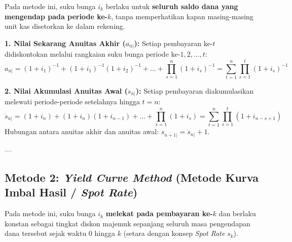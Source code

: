 \documentclass[11pt,a4paper]{article}
\begin{document}
\begin{definitionbox}
Pada metode ini, suku bunga $i_k$ berlaku untuk \textbf{seluruh saldo dana yang mengendap pada periode ke-$k$}, tanpa memperhatikan kapan masing-masing unit kas disetorkan ke dalam rekening.
\end{definitionbox}

\begin{center}
\end{center}

\textbf{1. Nilai Sekarang Anuitas Akhir ($a_{\overline{n}|}$):}
Setiap pembayaran ke-$t$ didiskontokan melalui rangkaian suku bunga periode ke-$1, 2, \dots, t$:
\begin{equation}
    a_{\overline{n}|} = (1+i_1)^{-1} + (1+i_1)^{-1}(1+i_2)^{-1} + \dots + \prod_{s=1}^n (1+i_s)^{-1} = \sum_{t=1}^n \prod_{s=1}^t (1+i_s)^{-1}
\end{equation}

\textbf{2. Nilai Akumulasi Anuitas Awal ($\ddot{s}_{\overline{n}|}$):}
Setiap pembayaran diakumulasikan melewati periode-periode setelahnya hingga $t = n$:
\begin{equation}
    \ddot{s}_{\overline{n}|} = (1+i_n) + (1+i_n)(1+i_{n-1}) + \dots + \prod_{s=1}^n (1+i_s) = \sum_{t=1}^n \prod_{s=1}^t (1+i_{n-s+1})
\end{equation}
Hubungan antara anuitas akhir dan anuitas awal: $s_{\overline{n+1}|} = \ddot{s}_{\overline{n}|} + 1$.

---

\subsection{Metode 2: \textit{Yield Curve Method} (Metode Kurva Imbal Hasil / \textit{Spot Rate})}

\begin{definitionbox}
Pada metode ini, suku bunga $i_k$ \textbf{melekat pada pembayaran ke-$k$} dan berlaku konstan sebagai tingkat diskon majemuk sepanjang seluruh masa pengendapan dana tersebut sejak waktu $0$ hingga $k$ (setara dengan konsep \textit{Spot Rate} $s_k$).
\end{definitionbox}
\end{document}
